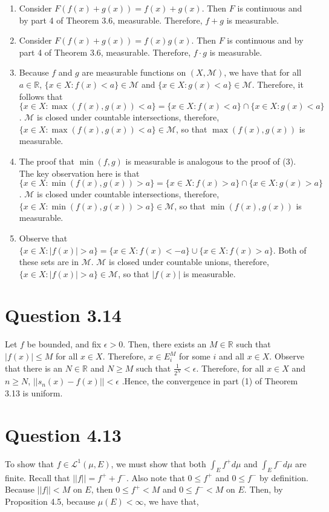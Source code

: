 \documentclass{article}
\begin{document}
    \begin{enumerate}
      \item Consider $F(f(x) + g(x)) = f(x) + g(x)$. Then $F$ is continuous and by part 4 of Theorem 3.6, measurable. Therefore, $f + g$ is measurable.
      \item Consider $F(f(x) + g(x)) = f(x)g(x)$. Then $F$ is continuous and by part 4 of Theorem 3.6, measurable. Therefore, $f \cdot g$ is measurable.
      \item Because $f$ and $g$ are measurable functions on $(X,\mathcal{M})$, we have that for all $a \in \mathbb{R}$, $\{x \in X : f(x) < a \} \in \mathcal{M}$ and $\{x \in X : g(x) < a \} \in \mathcal{M}$. Therefore, it follows that $\{x \in X : \max(f(x),g(x)) < a \} = \{x \in X : f(x) < a \} \cap \{x \in X : g(x) < a \}$. $\mathcal{M}$
      is closed under countable intersections, therefore, $\{x \in X : \max(f(x),g(x)) < a \} \in \mathcal{M}$, so that $\max(f(x), g(x))$ is measurable.
      \item The proof that $\min(f,g)$ is measurable is analogous to the proof of (3). The key observation here is that $\{x \in X : \min(f(x),g(x)) > a \} = \{x \in X : f(x) > a \} \cap \{x \in X : g(x) > a \}$. $\mathcal{M}$ is closed under countable intersections, therefore, $\{x \in X : \min(f(x),g(x)) > a \} \in \mathcal{M}$, so that $\min(f(x), g(x))$ is measurable.
      \item Observe that $\{x \in X : |f(x)| > a \} = \{x \in X : f(x) < -a \} \cup \{x \in X : f(x) > a \}$. Both of these sets are in $\mathcal{M}$. $\mathcal{M}$ is closed under countable unions, therefore, $\{x \in X : |f(x)| > a \} \in \mathcal{M}$, so that $|f(x)|$ is measurable.
    \end{enumerate}

    \section*{Question 3.14}

     Let $f$ be bounded, and fix $\epsilon > 0$. Then, there exists an $M \in \mathbb{R}$ such that $|f(x)| \leq M$ for all $x \in X$. Therefore, $x \in E^M_i$ for some $i$ and all $x \in X$. Observe that there is an $N \in \mathbb{R}$ and $N \geq M$ such that $\frac{1}{2^N} < \epsilon$. Therefore, for all $x \in X$ and $n \geq N$, $|| s_n(x) - f(x) || < \epsilon$
    .Hence, the convergence in part (1) of Theorem 3.13 is uniform.


    \section*{Question 4.13}
    To show that $f \in \mathscr{L}^{1}(\mu, E)$, we must show that both $\int_E f^+ d \mu$ and $\int_E f^- d \mu$ are finite.
    \newline
    \newline
    Recall that $||f|| = f^+ + f^-$. Also note that $0 \leq f^+$ and $0 \leq f^-$ by definition. Because $||f|| < M$ on $E$, then $0 \leq f^+ < M$ and $0 \leq f^- < M$ on $E$.
\newline
\newline
    Then, by Proposition 4.5, because $\mu(E) < \infty$, we have that,
\end{document}
